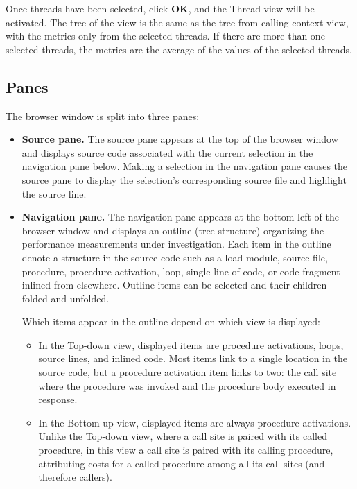 \documentclass[english]{article}
\begin{document}
\begin{itemize}
Once threads have been selected, click \textbf{OK}, and the Thread view will be activated. 
The tree of the view is the same as the tree from calling context view, with the metrics only from the selected threads.
If there are more than one selected threads, the metrics are the average of the values of the selected threads.


\end{itemize}


\subsection{Panes}

The browser window is split into three panes:

\begin{itemize}

\item \textbf{Source pane.} The source pane appears at the top of the browser window
and displays source code associated with the current selection in the navigation pane below.
Making a selection in the navigation pane causes the source pane
to display the selection's corresponding source file and highlight the source line.

\item \textbf{Navigation pane.}
The navigation pane appears at the bottom left of the browser window
and displays an outline (tree structure) organizing the performance measurements under investigation.
Each item in the outline denote a structure in the source code such as a
load module, source file, procedure, procedure activation,
loop, single line of code, or code fragment inlined from elsewhere.
Outline items can be selected and their children folded and unfolded.

Which items appear in the outline depend on which view is displayed: 

\begin{itemize}

\item In the Top-down view, displayed items are
procedure activations, loops, source lines, and inlined code. 
Most items link to a single location in the source code,
but a procedure activation item links to two:
the call site where the procedure was invoked and the procedure body executed in response.

\item In the Bottom-up view, displayed items are always procedure activations.
Unlike the Top-down view, where a call site is paired with its called procedure,
in this view a call site is paired with its calling procedure,
attributing costs for a called procedure among all its call sites (and therefore callers).


\end{itemize}
\end{itemize}
\end{document}
